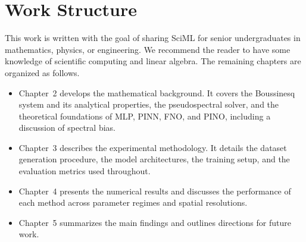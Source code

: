 \section{Work Structure}

This work is written with the goal of sharing SciML for senior undergraduates in mathematics, physics, or engineering. We recommend the reader to have some knowledge of scientific computing and linear algebra.
The remaining chapters are organized as follows.

\begin{itemize}
    \item Chapter~2 develops the mathematical background. It covers the
          Boussinesq system and its analytical properties, the pseudospectral solver,
          and the theoretical foundations of MLP, PINN, FNO, and PINO, including a
          discussion of spectral bias.

    \item Chapter~3 describes the experimental methodology. It details the
          dataset generation procedure, the model architectures, the training setup,
          and the evaluation metrics used throughout.

    \item Chapter~4 presents the numerical results and discusses the
          performance of each method across parameter regimes and spatial resolutions.

    \item Chapter~5 summarizes the main findings and outlines directions for
          future work.
\end{itemize}